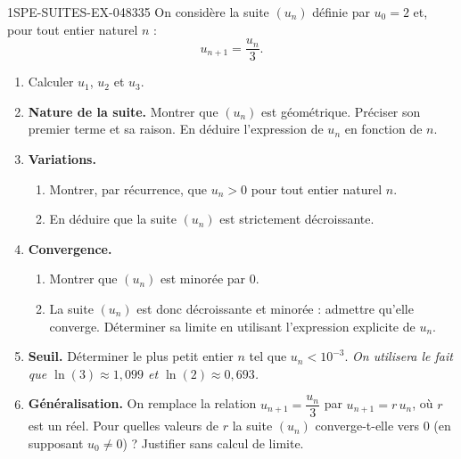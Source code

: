 \begin{exercice}{1SPE-SUITES-EX-048}{3}{35}
On considère la suite $(u_n)$ définie par $u_0 = 2$ et, pour tout entier naturel $n$ :
\[
  u_{n+1} = \frac{u_n}{3}.
\]

\begin{enumerate}
  \item Calculer $u_1$, $u_2$ et $u_3$.

  \item \textbf{Nature de la suite.} Montrer que $(u_n)$ est géométrique. Préciser son premier terme et sa raison. En déduire l'expression de $u_n$ en fonction de $n$.

  \item \textbf{Variations.}
  \begin{enumerate}
    \item Montrer, par récurrence, que $u_n > 0$ pour tout entier naturel $n$.
    \item En déduire que la suite $(u_n)$ est strictement décroissante.
  \end{enumerate}

  \item \textbf{Convergence.}
  \begin{enumerate}
    \item Montrer que $(u_n)$ est minorée par $0$.
    \item La suite $(u_n)$ est donc décroissante et minorée : admettre qu'elle converge. Déterminer sa limite en utilisant l'expression explicite de $u_n$.
  \end{enumerate}

  \item \textbf{Seuil.} Déterminer le plus petit entier $n$ tel que $u_n < 10^{-3}$.
  \textit{On utilisera le fait que $\ln(3) \approx 1{,}099$ et $\ln(2) \approx 0{,}693$.}

  \item \textbf{Généralisation.} On remplace la relation $u_{n+1} = \dfrac{u_n}{3}$ par $u_{n+1} = r\,u_n$, où $r$ est un réel.
  Pour quelles valeurs de $r$ la suite $(u_n)$ converge-t-elle vers $0$ (en supposant $u_0 \neq 0$) ? Justifier sans calcul de limite.
\end{enumerate}
\end{exercice}
